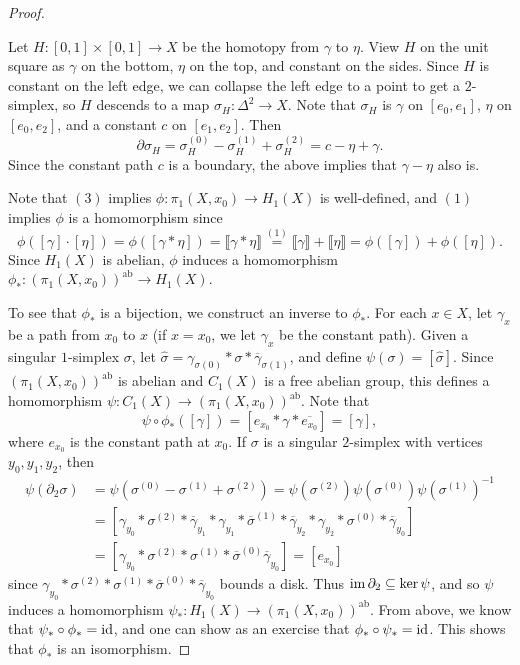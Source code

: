 \begin{proof}
\begin{enumerate}
      Let $H : [0, 1] \times [0, 1] \to X$ be the
      homotopy from $\gamma$ to $\eta$. View
      $H$ on the unit square as $\gamma$ on the
      bottom, $\eta$ on the top, and constant
      on the sides. Since $H$ is constant on the
      left edge, we can collapse the left edge to a
      point to get a $2$-simplex, so $H$ descends to
      a map $\sigma_H : \Delta^2 \to X$. Note that
      $\sigma_H$ is $\gamma$ on $[e_0, e_1]$,
      $\eta$ on $[e_0, e_2]$, and a constant $c$
      on $[e_1, e_2]$. Then
      \[
        \partial \sigma_H = \sigma_H^{(0)} - \sigma_H^{(1)} + \sigma_H^{(2)}
        = c - \eta + \gamma.
      \]
      Since the constant path $c$ is a boundary,
      the above implies that $\gamma - \eta$ also is.
  \end{enumerate}
  Note that $(3)$ implies
  $\phi : \pi_1(X, x_0) \to H_1(X)$ is well-defined, and
  $(1)$ implies $\phi$ is a homomorphism
  since
  \[
    \phi([\gamma] \cdot [\eta])
    = \phi([\gamma * \eta])
    = \llbracket \gamma * \eta \rrbracket
    \overset{(1)}{=} \llbracket \gamma \rrbracket + \llbracket \eta \rrbracket
    = \phi([\gamma]) + \phi([\eta]).
  \]
  Since $H_1(X)$ is abelian, $\phi$ induces
  a homomorphism
  $\phi_* : (\pi_1(X, x_0))^{\mathrm{ab}} \to H_1(X)$.

  To see that $\phi_*$ is a bijection, we construct
  an inverse to $\phi_*$. For each $x \in X$, let
  $\gamma_x$ be a path from $x_0$ to $x$ (if $x = x_0$,
  we let $\gamma_x$ be the constant path). Given a
  singular $1$-simplex $\sigma$, let
  $\widehat{\sigma} = \gamma_{\sigma(0)} * \sigma * \overline{\gamma}_{\sigma(1)}$, and
  define $\psi(\sigma) = [\widehat{\sigma}]$.
  Since $(\pi_1(X, x_0))^{\mathrm{ab}}$ is abelian
  and $C_1(X)$ is a free abelian group, this defines
  a homomorphism $\psi : C_1(X) \to (\pi_1(X, x_0))^{\mathrm{ab}}$. Note that
  \[
    \psi \circ \phi_*([\gamma]) = [e_{x_0} * \gamma * \overline{e_{x_0}}] = [\gamma],
  \]
  where $e_{x_0}$ is the constant path at $x_0$.
  If $\sigma$ is a singular $2$-simplex with vertices
  $y_0, y_1, y_2$, then
  \begin{align*}
    \psi(\partial_2 \sigma)
    &= \psi(\sigma^{(0)} - \sigma^{(1)} + \sigma^{(2)})
    = \psi(\sigma^{(2)}) \psi(\sigma^{(0)}) \psi(\sigma^{(1)})^{-1} \\
    &= [\gamma_{y_0} * \sigma^{(2)} * \overline{\gamma}_{y_1} * \gamma_{y_1} * \overline{\sigma}^{(1)} * \overline{\gamma}_{y_2} * \gamma_{y_2} * \sigma^{(0)} * \overline{\gamma}_{y_0}] \\
    &= [\gamma_{y_0} * \sigma^{(2)} * \sigma^{(1)} * \overline{\sigma}^{(0)} \overline{\gamma}_{y_0}]
    = [e_{x_0}]
  \end{align*}
  since $\gamma_{y_0} * \sigma^{(2)} * \sigma^{(1)} * \overline{\sigma}^{(0)} * \overline{\gamma}_{y_0}$
  bounds a disk. Thus $\operatorname{im} \partial_2 \subseteq \ker \psi$,
  and so $\psi$ induces a homomorphism
  $\psi_* : H_1(X) \to (\pi_1(X, x_0))^{\mathrm{ab}}$.
  From above, we know that $\psi_* \circ \phi_* = \operatorname{id}$,
  and one can show as an exercise that
  $\phi_* \circ \psi_* = \operatorname{id}$. This shows that
  $\phi_*$ is an isomorphism.
\end{proof}
